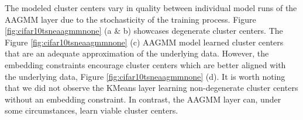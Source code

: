 \documentclass[10pt,twocolumn,letterpaper]{article}
\begin{document}

The modeled cluster centers vary in quality between individual model runs of the AAGMM layer due to the stochasticity of the training process.
Figure \ref{fig:cifar10tsneaagmmnone} (a \& b) showcases degenerate cluster centers.
The Figure \ref{fig:cifar10tsneaagmmnone} (c) AAGMM model learned cluster centers that are an adequate approximation of the underlying data.
However, the embedding constraints encourage cluster centers which are better aligned with the underlying data, Figure \ref{fig:cifar10tsneaagmmnone} (d).
It is worth noting that we did not observe the KMeans layer learning non-degenerate cluster centers without an embedding constraint.
In contrast, the AAGMM layer can, under some circumstances, learn viable cluster centers.
\end{document}
